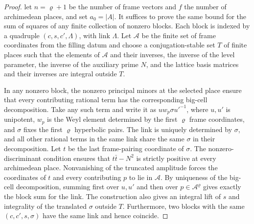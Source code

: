 \begin{proof}
let $n=\varrho+1$ be the number of frame vectors and $f$ the number of archimedean places, and set $a_0=|A|$.
It suffices to prove the same bound for the sum of squares of any finite collection of nonzero blocks.
Each block is indexed by a quadruple $(c,s,c',\Lambda)$, with link $\Lambda$.
Let $\mathcal A$ be the finite set of frame coordinates from the filling datum
and choose a conjugation-stable set $T$ of finite places such that the elements of $\mathcal A$ and their inverses, the inverse of the level parameter,
the inverse of the auxiliary prime $N$, and the lattice basis matrices and their inverses are integral outside $T$.

In any nonzero block, the nonzero principal minors at the selected place ensure that every contributing rational term has the corresponding big-cell decomposition.
Take any such term and write it as $u w_p\sigma u'^{-1}$,
where $u,u'$ is unipotent, $w_p$ is the Weyl element determined by the first $\varrho$ frame coordinates,
and $\sigma$ fixes the first $\varrho$ hyperbolic pairs. The link is uniquely determined by $\sigma$,
and all other rational terms in the same link share the same $\sigma$ in their decomposition.
Let $t$ be the last frame-pairing coordinate of $\sigma$. The nonzero-discriminant condition ensures that $t\bar t-N^2$
is strictly positive at every archimedean place. Nonvanishing of the truncated amplitude forces the coordinates of $t$ and every contributing $p$ to lie in
$\mathcal A$. By uniqueness of the big-cell decomposition, summing first over $u,u'$ and then over $p\in\mathcal A^{\varrho}$
gives exactly the block sum for the link.
The construction also gives an integral lift of $s$ and integrality of the translated $\sigma$ outside $T$.
Furthermore, two blocks with the same $(c,c',s,\sigma)$ have the same link and hence coincide.


\end{proof}
